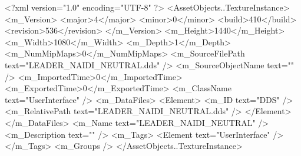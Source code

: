 <?xml version="1.0" encoding="UTF-8" ?>
<AssetObjects..TextureInstance>
	<m_Version>
		<major>4</major>
		<minor>0</minor>
		<build>410</build>
		<revision>536</revision>
	</m_Version>
	<m_Height>1440</m_Height>
	<m_Width>1080</m_Width>
	<m_Depth>1</m_Depth>
	<m_NumMipMaps>0</m_NumMipMaps>
	<m_SourceFilePath text="LEADER_NAIDI_NEUTRAL.dds" />
	<m_SourceObjectName text="" />
	<m_ImportedTime>0</m_ImportedTime>
	<m_ExportedTime>0</m_ExportedTime>
	<m_ClassName text="UserInterface" />
	<m_DataFiles>
		<Element>
			<m_ID text="DDS" />
			<m_RelativePath text="LEADER_NAIDI_NEUTRAL.dds" />
		</Element>
	</m_DataFiles>
	<m_Name text="LEADER_NAIDI_NEUTRAL" />
	<m_Description text="" />
	<m_Tags>
		<Element text="UserInterface" />
	</m_Tags>
	<m_Groups />
</AssetObjects..TextureInstance>
